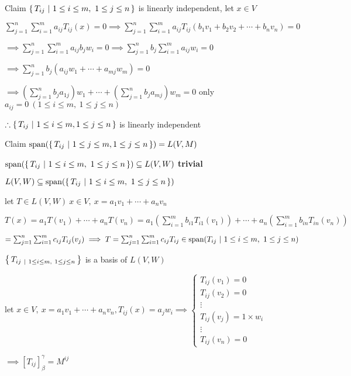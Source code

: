\begin{tcolorbox}
	Claim $\left\{ \,T_{ij}~|~1 \leq i \leq m,~1 \leq j \leq n \,\right\}$ is linearly independent, let $x \in V$
	
	$\sum^n_{j=1}\sum^m_{i=1}a_{ij}T_{ij}(x)=0 \implies \sum^n_{j=1}\sum^m_{i=1}a_{ij}T_{ij}(b_1v_1+b_2v_2+\cdots+b_nv_n) = 0$
	
	$\implies \sum^{n}_{j=1}\sum^{m}_{i=1}a_{ij}b_{j}w_{i}=0 \implies \sum^{n}_{j=1}b_j\sum^{m}_{i=1}a_{ij}w_i = 0 $
	
	$\implies \sum^{n}_{j=1}b_j(a_{ij}w_1+\cdots+a_{mj}w_m)=0 $
	
	$\implies (\sum^n_{j=1}b_ja_{1j})w_1 + \cdots + (\sum^n_{j=1}b_ja_{mj})w_m=0$ only $a_{ij} = 0 ~(1 \leq i \leq m,~1 \leq j \leq n)$
	
	$\therefore \left\{ \,T_{ij}~|~1 \leq i \leq m, 1 \leq j \leq n \,\right\}$ is linearly independent
	
	Claim $\text{span($\left\{ \,T_{ij}~|~1 \leq j \leq m,1 \leq j \leq n \,\right\}$)} = L(V,M)$
	
	$\text{span($\left\{ \,T_{ij}~|~1 \leq i \leq m,~ 1 \leq j \leq n \,\right\}$)} \subseteq L(V,W)$ \textbf{trivial}
	
	$L(V,W) \subseteq \text{span($\left\{ \,T_{ij}~|~1 \leq i \leq m,~ 1\leq j \leq n \,\right\}$)}$
	
	let $T \in L(V,W)~  x \in V,~ x = a_1v_1 + \cdots + a_nv_n$
	
	$T(x) = a_1T(v_1)+\cdots+a_nT(v_n) = a_1(\sum^m_{i=1}b_{i1}T_{i1}(v_1))+\cdots + a_n(\sum^m_{i=1}b_{in}T_{in}(v_n))$
	
	$= \sum^n_{j=1}\sum^m_{i=1}c_{ij}T_{ij}(v_j) \implies T = \sum^n_{j=1}\sum^m_{i=1}c_{ij}T_{ij} \in \text{span($T_{ij} ~|~1\leq i \leq m,~1 \leq j \leq n$)}$
	
	$\left\{ \,T_{ij~|~1 \leq i \leq m,~1 \leq j \leq n} \,\right\}$ is a basis of $L(V,W)$
	
	let $x \in V,~x = a_1v_1 + \cdots + a_nv_n, T_{ij}(x) = a_jw_i \implies \begin{cases}
		T_{ij}(v_1)=0\\T_{ij}(v_2)=0\\\vdots \\ T_{ij}(v_j)=1 \times w_i \\ \vdots \\ T_{ij}(v_n) = 0	\end{cases} $
		
		$\implies [T_{ij}]^{\gamma}_{\beta} = M^{ij}$
\end{tcolorbox}

